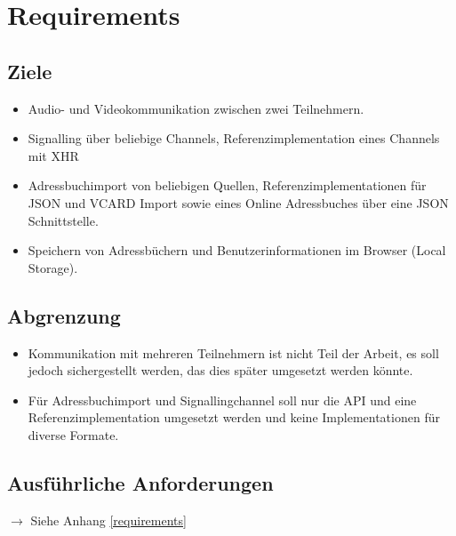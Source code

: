 \chapter{Requirements}
	\section{Ziele}
		\begin{itemize}
			\item Audio- und Videokommunikation zwischen zwei Teilnehmern.
			\item Signalling über beliebige Channels, Referenzimplementation eines Channels mit XHR
			\item Adressbuchimport von beliebigen Quellen, Referenzimplementationen für JSON und VCARD Import sowie eines Online Adressbuches über eine JSON Schnittstelle.
			\item Speichern von Adressbüchern und Benutzerinformationen im Browser (Local Storage).
		\end{itemize}

	
	\section{Abgrenzung}
		\begin{itemize}
			\item Kommunikation mit mehreren Teilnehmern ist nicht Teil der Arbeit, es soll jedoch sichergestellt werden, das dies später umgesetzt werden könnte.
			\item Für Adressbuchimport und Signallingchannel soll nur die API und eine Referenzimplementation umgesetzt werden und keine Implementationen für diverse Formate.
		\end{itemize}
		
	\section{Ausführliche Anforderungen}
		$\rightarrow$ Siehe Anhang \ref{requirements}